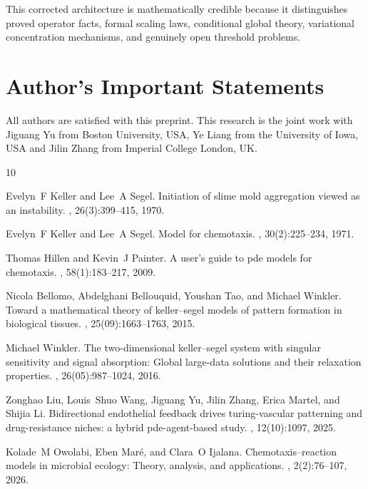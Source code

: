 \documentclass[pdflatex,sn-mathphys-num]{sn-jnl}%
\theoremstyle{thmstyleone}
\theoremstyle{thmstyletwo}
\theoremstyle{thmstylethree}
\begin{document}
This corrected architecture is mathematically credible because it distinguishes
proved operator facts, formal scaling laws, conditional global theory,
variational concentration mechanisms, and genuinely open threshold problems.

\section*{Author’s Important Statements}
All authors are satisfied with this preprint. This research is the joint work with Jiguang Yu from Boston University, USA, Ye Liang from the University of Iowa, USA and Jilin Zhang from Imperial College London, UK.


\begin{thebibliography}{10}

Evelyn~F Keller and Lee~A Segel.
\newblock Initiation of slime mold aggregation viewed as an instability.
, 26(3):399--415, 1970.

Evelyn~F Keller and Lee~A Segel.
\newblock Model for chemotaxis.
, 30(2):225--234, 1971.

Thomas Hillen and Kevin~J Painter.
\newblock A user’s guide to pde models for chemotaxis.
, 58(1):183--217, 2009.

Nicola Bellomo, Abdelghani Bellouquid, Youshan Tao, and Michael Winkler.
\newblock Toward a mathematical theory of keller--segel models of pattern formation in biological tissues.
, 25(09):1663--1763, 2015.

Michael Winkler.
\newblock The two-dimensional keller--segel system with singular sensitivity and signal absorption: Global large-data solutions and their relaxation properties.
, 26(05):987--1024, 2016.

Zonghao Liu, Louis~Shuo Wang, Jiguang Yu, Jilin Zhang, Erica Martel, and Shijia Li.
\newblock Bidirectional endothelial feedback drives turing-vascular patterning and drug-resistance niches: a hybrid pde-agent-based study.
, 12(10):1097, 2025.

Kolade~M Owolabi, Eben Mar{\'e}, and Clara~O Ijalana.
\newblock Chemotaxis--reaction models in microbial ecology: Theory, analysis, and applications.
, 2(2):76--107, 2026.


\end{thebibliography}
\end{document}
